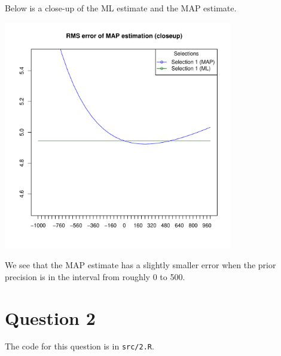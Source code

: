 \documentclass[a4paper, oneside, final]{memoir}
\begin{document}
Below is a close-up of the ML estimate and the MAP estimate.

\includegraphics[width=10cm]{img/question12-plot-b.pdf}

We see that the MAP estimate has a slightly smaller error when the
prior precision is in the interval from roughly 0 to 500.

\section*{Question 2}

The code for this question is in \texttt{src/2.R}.
\end{document}
